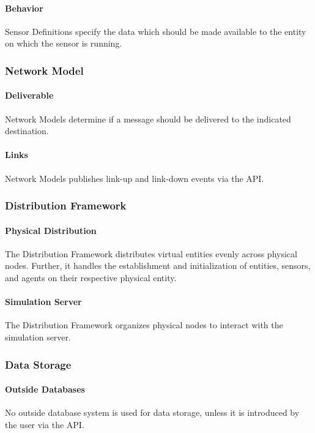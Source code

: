 \documentclass[titlepage]{article}
\newcommand{\cbox}[0]{
    \CheckBox[height=5pt,width=5pt]{}
}
\begin{document}
\begin{Form}
    \paragraph{Behavior} Sensor Definitions specify the data which should be made available to the entity on which the sensor is running.\cbox

\subsubsection{Network Model}
    \paragraph{Deliverable} Network Models determine if a message should be delivered to the indicated destination.\cbox
    \paragraph{Links} Network Models publishes link-up and link-down events via the API.\cbox

\subsubsection{Distribution Framework}
	\paragraph{Physical Distribution} The Distribution Framework distributes virtual entities evenly across physical nodes. Further, it handles the establishment and initialization of entities, sensors, and agents on their respective physical entity.\cbox
	\paragraph{Simulation Server} The Distribution Framework organizes physical nodes to interact with the simulation server.\cbox


\subsubsection{Data Storage%
  \label{data-storage}%
}
    \paragraph{Outside Databases} No outside database system is used for data storage, unless it is introduced by the user via the API.\cbox

\end{Form}
\end{document}
